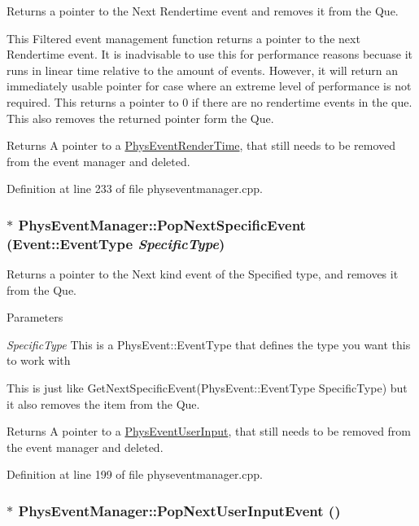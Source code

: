 Returns a pointer to the Next Rendertime event and removes it from the Que. 

This Filtered event management function returns a pointer to the next Rendertime event. It is inadvisable to use this for performance reasons becuase it runs in linear time relative to the amount of events. However, it will return an immediately usable pointer for case where an extreme level of performance is not required. This returns a pointer to 0 if there are no rendertime events in the que. This also removes the returned pointer form the Que. \begin{DoxyReturn}{Returns}
A pointer to a \hyperlink{classPhysEventRenderTime}{PhysEventRenderTime}, that still needs to be removed from the event manager and deleted. 
\end{DoxyReturn}


Definition at line 233 of file physeventmanager.cpp.

\hypertarget{classPhysEventManager_ae1a12ccef3435f164472e6f8c38c77fe}{
\subsubsection[{PopNextSpecificEvent}]{ $\ast$ PhysEventManager::PopNextSpecificEvent ({\bf Event::EventType} {\em SpecificType})}}
\label{d5/dd7/classPhysEventManager_ae1a12ccef3435f164472e6f8c38c77fe}


Returns a pointer to the Next kind event of the Specified type, and removes it from the Que. 


\begin{DoxyParams}{Parameters}
\item[{\em SpecificType}]This is a PhysEvent::EventType that defines the type you want this to work with\end{DoxyParams}
This is just like GetNextSpecificEvent(PhysEvent::EventType SpecificType) but it also removes the item from the Que. \begin{DoxyReturn}{Returns}
A pointer to a \hyperlink{classPhysEventUserInput}{PhysEventUserInput}, that still needs to be removed from the event manager and deleted. 
\end{DoxyReturn}


Definition at line 199 of file physeventmanager.cpp.

\hypertarget{classPhysEventManager_ad6612a6e1c728941e2c467e7f136ca51}{
\subsubsection[{PopNextUserInputEvent}]{ $\ast$ PhysEventManager::PopNextUserInputEvent ()}}
\label{d5/dd7/classPhysEventManager_ad6612a6e1c728941e2c467e7f136ca51}


